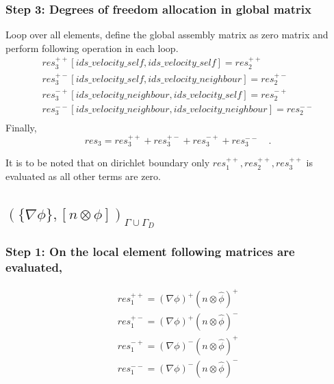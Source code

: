 \documentclass[a4paper]{book}
\begin{document}
\subsubsection{Step 3: Degrees of freedom allocation in global matrix}

Loop over all elements, define the global assembly matrix as zero matrix and perform following operation in each loop.
\begin{equation}
\begin{split}
res_3^{++}[ids\_velocity\_self,ids\_velocity\_self] = res_2^{++}\\
res_3^{+-}[ids\_velocity\_self,ids\_velocity\_neighbour] = res_2^{+-}\\
res_3^{-+}[ids\_velocity\_neighbour,ids\_velocity\_self] = res_2^{-+}\\
res_3^{--}[ids\_velocity\_neighbour,ids\_velocity\_neighbour] = res_2^{--}\\
\end{split}
\end{equation}
Finally,
\begin{equation}
res_3 = res_3^{++} + res_3^{+-} + res_3^{-+} + res_3^{--} \quad \textrm{.}
\end{equation}

It is to be noted that on dirichlet boundary only $res_1^{++}, res_2^{++}, res_3^{++}$ is evaluated as all other terms are zero.

\subsection{$(\lbrace \nabla \phi \rbrace, [n \otimes \phi])_{\Gamma \cup \Gamma_D}$}

\subsubsection{Step 1: On the local element following matrices are evaluated,}
\begin{equation}
\begin{split}
res_1^{++} = (\nabla \phi)^+ (n \otimes \hat{\phi})^+\\
res_1^{+-} = (\nabla \phi)^+ (n \otimes \hat{\phi})^-\\
res_1^{-+} = (\nabla \phi)^- (n \otimes \hat{\phi})^+\\
res_1^{--} = (\nabla \phi)^- (n \otimes \hat{\phi})^-\\
\end{split}
\end{equation}
\end{document}
